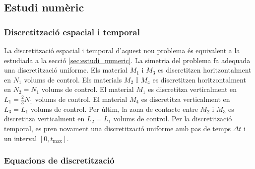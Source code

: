 
\subsection{Estudi numèric}

\subsubsection{Discretització espacial i temporal}

La discretització espacial i temporal d'aquest nou problema és equivalent a la estudiada a la secció \ref{sec:estudi_numeric}. La simetria del problema fa adequada una discretització uniforme. Els material $M_1$ i $M_3$ es discretitzen horitzontalment en $N_1$ volums de control. Els materials $M_2$ I $M_4$ es discretitzen horitzontalment en $N_2 = N_1$ volums de control. El material $M_1$ es discretitza verticalment en $L_1 = \frac{2}{3} N_1$ volums de control. El material $M_4$ es discretitza verticalment en $L_3 = L_1$ volums de control. Per últim, la zona de contacte entre $M_2$ i $M_3$ es discretitza verticalment en $L_2 = L_1$ volums de control. Per la discretització temporal, es pren novament una discretització uniforme amb pas de temps $\Delta t$ i un interval $[0, t_\text{max}]$.

\subsubsection{Equacions de discretització}

